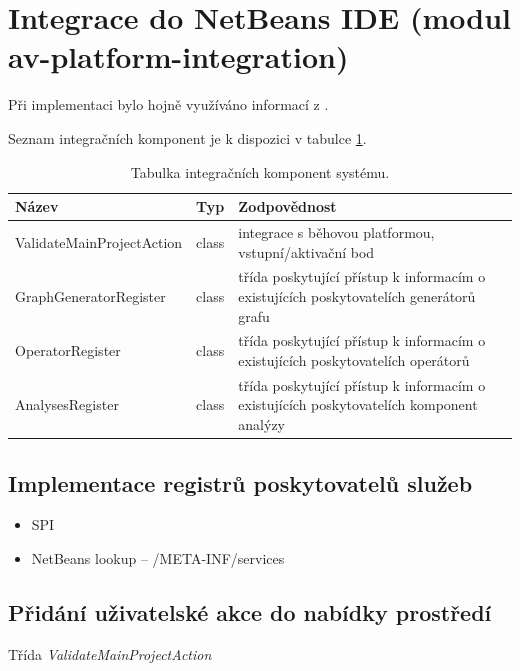 \section{Integrace do NetBeans IDE (modul av-platform-integration)}

Při implementaci bylo hojně využíváno informací z \cite{netbeans_platform}.

Seznam integračních komponent je k dispozici v tabulce \ref{implementation-integration_components}.

\begin{table}
  \caption{Tabulka integračních komponent systému. \label{implementation-integration_components}}
  \begin{center}
    \begin{tabular}{ | l | l | p{8cm} | }
      \hline
      \textbf{Název} & \textbf{Typ} & \textbf{Zodpovědnost} \\
      \hline
      \hline
      ValidateMainProjectAction & class & integrace s běhovou platformou, vstupní/aktivační bod \\ \hline
      GraphGeneratorRegister & class & třída poskytující přístup k informacím o existujících poskytovatelích generátorů grafu \\ \hline
      OperatorRegister & class & třída poskytující přístup k informacím o existujících poskytovatelích operátorů \\ \hline
      AnalysesRegister & class & třída poskytující přístup k informacím o existujících poskytovatelích komponent analýzy \\ \hline
    \end{tabular}
  \end{center}
\end{table}

\subsection{Implementace registrů poskytovatelů služeb}
\begin{itemize}
\item SPI
\item NetBeans lookup -- /META-INF/services
\end{itemize}

\subsection{Přidání uživatelské akce do nabídky prostředí}
Třída \emph{ValidateMainProjectAction}

